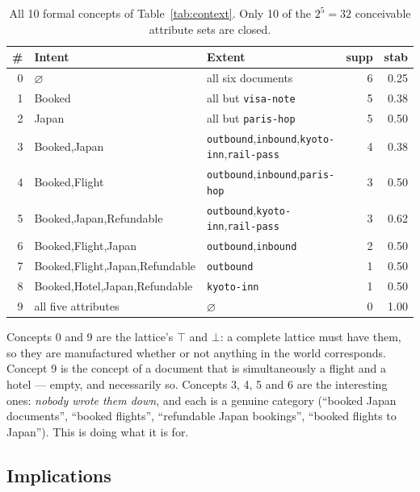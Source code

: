 \begin{table}[h]
\centering\small
\caption{All 10 formal concepts of Table~\ref{tab:context}. Only 10 of the
$2^5 = 32$ conceivable attribute sets are closed.}
\label{tab:concepts}
\vspace{1mm}
\begin{tabular}{r l l r r}
\toprule
\# & \textbf{Intent} & \textbf{Extent} & supp & stab\\
\midrule
0 & $\varnothing$ & all six documents & 6 & 0.25\\
1 & \textsf{Booked} & all but \texttt{visa-note} & 5 & 0.38\\
2 & \textsf{Japan} & all but \texttt{paris-hop} & 5 & 0.50\\
3 & \textsf{Booked},\textsf{Japan} & \texttt{outbound},\texttt{inbound},\texttt{kyoto-inn},\texttt{rail-pass} & 4 & 0.38\\
4 & \textsf{Booked},\textsf{Flight} & \texttt{outbound},\texttt{inbound},\texttt{paris-hop} & 3 & 0.50\\
5 & \textsf{Booked},\textsf{Japan},\textsf{Refundable} & \texttt{outbound},\texttt{kyoto-inn},\texttt{rail-pass} & 3 & 0.62\\
6 & \textsf{Booked},\textsf{Flight},\textsf{Japan} & \texttt{outbound},\texttt{inbound} & 2 & 0.50\\
7 & \textsf{Booked},\textsf{Flight},\textsf{Japan},\textsf{Refundable} & \texttt{outbound} & 1 & 0.50\\
8 & \textsf{Booked},\textsf{Hotel},\textsf{Japan},\textsf{Refundable} & \texttt{kyoto-inn} & 1 & 0.50\\
9 & all five attributes & $\varnothing$ & 0 & 1.00\\
\bottomrule
\end{tabular}
\end{table}

Concepts 0 and 9 are the lattice's $\top$ and $\bot$: a complete lattice must
have them, so they are manufactured whether or not anything in the world
corresponds. Concept 9 is the concept of a document that is simultaneously a
flight and a hotel --- empty, and necessarily so. Concepts 3, 4, 5 and 6 are
the interesting ones: \emph{nobody wrote them down}, and each is a genuine
category (``booked Japan documents'', ``booked flights'', ``refundable Japan
bookings'', ``booked flights to Japan''). This is \fca{} doing what it is for.

\subsection{Implications}
\label{sec:implications}

